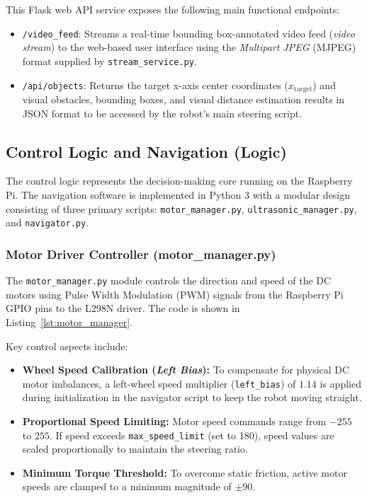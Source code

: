This Flask web API service exposes the following main functional endpoints:
\begin{itemize}
    \item \texttt{/video\_feed}: Streams a real-time bounding box-annotated video feed (\textit{video stream}) to the web-based user interface using the \textit{Multipart JPEG} (MJPEG) format supplied by \texttt{stream\_service.py}.
    \item \texttt{/api/objects}: Returns the target x-axis center coordinates ($x_{\text{target}}$) and visual obstacles, bounding boxes, and visual distance estimation results in JSON format to be accessed by the robot's main steering script.
\end{itemize}

\subsection{Control Logic and Navigation (Logic)}
The control logic represents the decision-making core running on the Raspberry Pi. The navigation software is implemented in Python 3 with a modular design consisting of three primary scripts: \texttt{motor\_}\allowbreak\texttt{manager.py}, \texttt{ultrasonic\_}\allowbreak\texttt{manager.py}, and \texttt{navigator.py}.

\subsubsection{Motor Driver Controller (motor\_manager.py)}
The \texttt{motor\_}\allowbreak\texttt{manager.py} module controls the direction and speed of the DC motors using Pulse Width Modulation (PWM) signals from the Raspberry Pi GPIO pins to the L298N driver. The code is shown in Listing~\ref{lst:motor_manager}.

Key control aspects include:
\begin{itemize}
    \item \textbf{Wheel Speed Calibration (\textit{Left Bias}):} To compensate for physical DC motor imbalances, a left-wheel speed multiplier (\texttt{left\_}\allowbreak\texttt{bias}) of $1.14$ is applied during initialization in the navigator script to keep the robot moving straight.
    \item \textbf{Proportional Speed Limiting:} Motor speed commands range from $-255$ to $255$. If speed exceeds \texttt{max\_}\allowbreak\texttt{speed\_}\allowbreak\texttt{limit} (set to 180), speed values are scaled proportionally to maintain the steering ratio.
    \item \textbf{Minimum Torque Threshold:} To overcome static friction, active motor speeds are clamped to a minimum magnitude of $\pm 90$.
\end{itemize}

